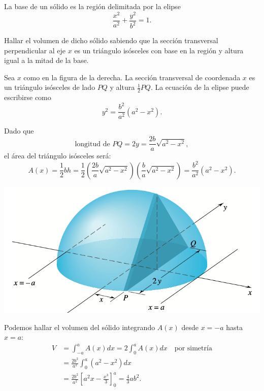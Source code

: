 \begin{example}
La base de un sólido es la región delimitada por la elipse
\[
\frac{x^2}{a^2} + \frac{y^2}{b^2} = 1.
\]

Hallar el volumen de dicho sólido sabiendo que la sección transversal perpendicular al eje $x$ es un triángulo isósceles con base en la región y altura igual a la mitad de la base.

\noindent\begin{minipage}{.6\textwidth}
  Sea $x$ como en la figura de la derecha. La sección transversal de coordenada $x$ es un triángulo isósceles de lado $PQ$ y altura $\frac{1}{2}PQ$. La ecuación de la elipse puede escribirse como
  \[
  y^2 = \frac{b^2}{a^2}(a^2 - x^2).
  \]
  
  Dado que
  \[
  \text{longitud de } PQ = 2y = \frac{2b}{a}\sqrt{a^2 - x^2},
  \]
  el área del triángulo isósceles será:
  \[
  A(x) = \frac{1}{2}bh = \frac{1}{2} \left(\frac{2b}{a}\sqrt{a^2 - x^2}\right) \left(\frac{b}{a}\sqrt{a^2 - x^2}\right) = \frac{b^2}{a^2}(a^2 - x^2).
  \]
\end{minipage}
\begin{minipage}{.39\textwidth}
  \begin{center}
    \includegraphics[width=.9\textwidth]{pics/volumen-2.png}
  \end{center}
\end{minipage}

Podemos hallar el volumen del sólido integrando $A(x)$ desde $x = -a$ hasta $x = a$:
\begin{align*}
V &= \int_{-a}^{a} A(x) dx = 2 \int_{0}^{a} A(x) dx \quad \text{por simetría}
\\
&= \frac{2b^2}{a^2} \int_{0}^{a} (a^2 - x^2) dx
\\
&= \frac{2b^2}{a^2} \left[ a^2x - \frac{x^3}{3} \right]_0^a = \frac{4}{3}ab^2.
\end{align*}

\end{example}



